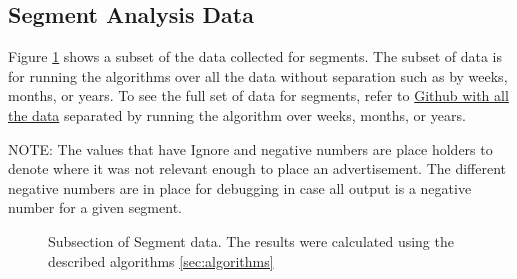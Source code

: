 \documentclass[titlepage,twocolumn]{article}
\begin{document}
\clearpage

\subsection{Segment Analysis Data}
\label{seg:segmentAnalysisData}
\par Figure \ref{tab:tableSegmentSub} shows a subset of the data collected for segments. The subset of data is for running the algorithms over all the data without separation such as by weeks, months, or years. To see the full set of data for segments, refer to \href{https://github.com/gateslm/CSSE-Senior-Thesis/blob/master/Results/finalResultSegment.xlsx}{Github with all the data} separated by running the algorithm over weeks, months, or years.


\par NOTE: The values that have Ignore and negative numbers are place holders to denote where it was not relevant enough to place an advertisement. The different negative numbers are in place for debugging in case all output is a negative number for  a given segment.

\begin{figure}[htbp]
	\centering
  
  \label{tab:tableSegmentSub}%
\caption{Subsection of Segment data. The results were calculated using the described algorithms \ref{sec:algorithms} }
\end{figure}%


\clearpage
\twocolumn
\end{document}

